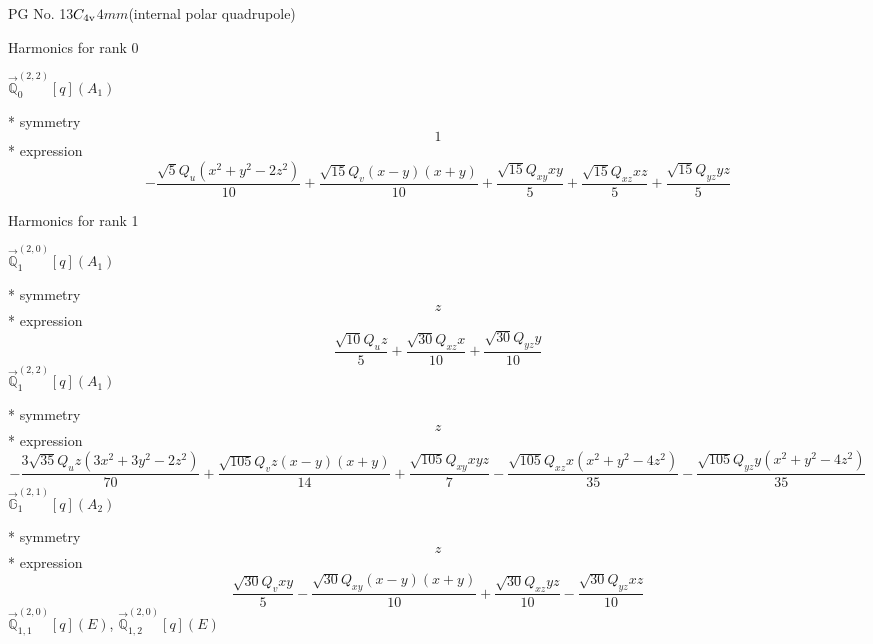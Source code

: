 \documentclass[fleqn,8pt]{jsarticle}
\begin{document}
\setcounter{MaxMatrixCols}{32}

\renewcommand{\tablename}{Table~}
\renewcommand{\figurename}{Figure~}
\begin{center}
\LARGE
PG No. 13\quad$C_{\rm 4v}$\quad$4mm$\quad[ tetragonal ] (internal polar quadrupole)
\end{center}

\noindent * Harmonics for rank 0

\noindent\quad $\vec{\mathbb{Q}}_{0}^{(2,2)}[q](A_{1})$

\noindent\quad ** symmetry
\begin{dmath*}
1
\end{dmath*}
\noindent\quad ** expression
\begin{dmath*}
- \frac{\sqrt{5} Q_{u} \left(x^{2} + y^{2} - 2 z^{2}\right)}{10} + \frac{\sqrt{15} Q_{v} \left(x - y\right) \left(x + y\right)}{10} + \frac{\sqrt{15} Q_{xy} x y}{5} + \frac{\sqrt{15} Q_{xz} x z}{5} + \frac{\sqrt{15} Q_{yz} y z}{5}
\end{dmath*}

\noindent * Harmonics for rank 1

\noindent\quad $\vec{\mathbb{Q}}_{1}^{(2,0)}[q](A_{1})$

\noindent\quad ** symmetry
\begin{dmath*}
z
\end{dmath*}
\noindent\quad ** expression
\begin{dmath*}
\frac{\sqrt{10} Q_{u} z}{5} + \frac{\sqrt{30} Q_{xz} x}{10} + \frac{\sqrt{30} Q_{yz} y}{10}
\end{dmath*}
\noindent\quad $\vec{\mathbb{Q}}_{1}^{(2,2)}[q](A_{1})$

\noindent\quad ** symmetry
\begin{dmath*}
z
\end{dmath*}
\noindent\quad ** expression
\begin{dmath*}
- \frac{3 \sqrt{35} Q_{u} z \left(3 x^{2} + 3 y^{2} - 2 z^{2}\right)}{70} + \frac{\sqrt{105} Q_{v} z \left(x - y\right) \left(x + y\right)}{14} + \frac{\sqrt{105} Q_{xy} x y z}{7} - \frac{\sqrt{105} Q_{xz} x \left(x^{2} + y^{2} - 4 z^{2}\right)}{35} - \frac{\sqrt{105} Q_{yz} y \left(x^{2} + y^{2} - 4 z^{2}\right)}{35}
\end{dmath*}
\noindent\quad $\vec{\mathbb{G}}_{1}^{(2,1)}[q](A_{2})$

\noindent\quad ** symmetry
\begin{dmath*}
z
\end{dmath*}
\noindent\quad ** expression
\begin{dmath*}
\frac{\sqrt{30} Q_{v} x y}{5} - \frac{\sqrt{30} Q_{xy} \left(x - y\right) \left(x + y\right)}{10} + \frac{\sqrt{30} Q_{xz} y z}{10} - \frac{\sqrt{30} Q_{yz} x z}{10}
\end{dmath*}
\noindent\quad $\vec{\mathbb{Q}}_{1,1}^{(2,0)}[q](E)$, $\vec{\mathbb{Q}}_{1,2}^{(2,0)}[q](E)$
\end{document}
